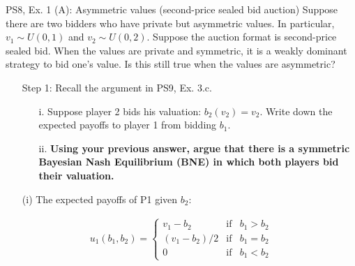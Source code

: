 \begin{frame}{PS8, Ex. 1 (A): Asymmetric values (second-price sealed bid auction)}
    Suppose there are two bidders who have private but asymmetric values. In particular, $v_1\sim U(0, 1)$ and $v_2\sim U(0, 2)$. Suppose the auction format is second-price sealed bid. When the values are private and symmetric, it is a weakly dominant strategy to bid one’s value. Is this still true when the values are asymmetric?
    \begin{multicols}{2}
      \begin{itemize}
        \item[Step 1:] Recall the argument in PS9, Ex. 3.c.
        \begin{itemize}\normalsize
          \item[i.]   Suppose player 2 bids his valuation: $b_2(v_2) = v_2$. Write down the expected payoffs to player 1 from bidding $b_1$.
          \item[ii.]  \textbf{Using your previous answer, argue that there is a symmetric Bayesian Nash Equilibrium (BNE) in which both players bid their valuation.}
        \end{itemize}
      \end{itemize}
      \vfill\null\columnbreak
      \begin{itemize}
        \item[(i)] The expected payoffs of P1 given $b_2$:
      \end{itemize}
      \vspace{-12pt}
      \begin{align*}
        u_1(b_1,b_2)=\left\{\begin{array}{lcl}
          v_1-b_2     & \text{if} & b_1>b_2 \\
          (v_1-b_2)/2 & \text{if} & b_1=b_2 \\
          0           & \text{if} & b_1<b_2
        \end{array}\right.
      \end{align*}
      \vfill\null
    \end{multicols}
\end{frame}
